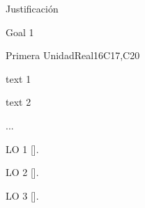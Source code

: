 \begin{syllabus}


\begin{justification}
Justificación 
\end{justification}

\begin{goals}
\item Goal 1
\end{goals}

\begin{outcomes}
   \item {}
   \item {}
   \item {}
\end{outcomes}

\begin{competences}
    \item {}
    \item {}
    \item {}
\end{competences}

\begin{unit}{Primera Unidad}{}{Real}{16}{C17,C20}
\begin{topics}
      \item text 1
      \item text 2
      \item ...
\end{topics}

\begin{learningoutcomes}
   \item LO 1 [\Usage].
   \item LO 2 [\Usage].
   \item LO 3 [\Usage].
\end{learningoutcomes}
\end{unit}



\begin{coursebibliography}
\end{coursebibliography}

\end{syllabus}
